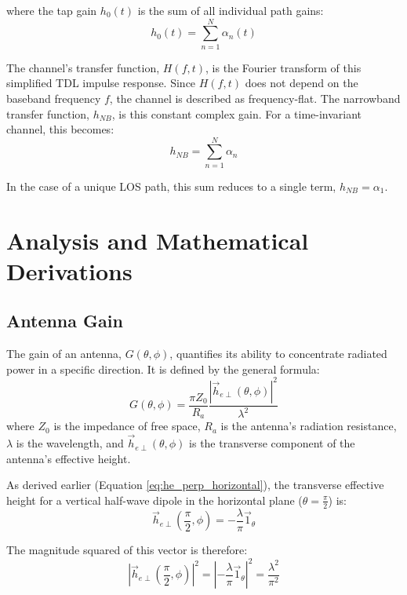 where the tap gain $h_0(t)$ is the sum of all individual path gains:
\begin{equation}
	h_0(t) = \sum_{n=1}^{N} \alpha_n(t)
\end{equation}

The channel's transfer function, $H(f,t)$, is the Fourier transform of this simplified TDL impulse response. Since $H(f,t)$ does not depend on the baseband frequency $f$, the channel is described as frequency-flat. The narrowband transfer function, $h_{NB}$, is this constant complex gain. For a time-invariant channel, this becomes:
\begin{equation}
	\label{eq:narrow}
	h_{NB} = \sum_{n=1}^{N} \alpha_n
\end{equation}

In the case of a unique LOS path, this sum reduces to a single term, $h_{NB} = \alpha_1$.

\section{Analysis and Mathematical Derivations}

\subsection{Antenna Gain}
The gain of an antenna, $G(\theta, \phi)$, quantifies its ability to concentrate radiated power in a specific direction. It is defined by the general formula:
\begin{equation}
	G(\theta,\phi) = \frac{\pi Z_0}{R_a} \frac{|\vec{h}_{e\perp}(\theta,\phi)|^2}{\lambda^2}
	\label{eq:gain_general}
\end{equation}
where $Z_0$ is the impedance of free space, $R_a$ is the antenna's radiation resistance, $\lambda$ is the wavelength, and $\vec{h}_{e\perp}(\theta,\phi)$ is the transverse component of the antenna's effective height.

As derived earlier (Equation \ref{eq:he_perp_horizontal}), the transverse effective height for a vertical half-wave dipole in the horizontal plane ($\theta = \frac{\pi}{2}$) is:
\begin{equation}
	\vec{h}_{e\perp}\left(\frac{\pi}{2},\phi\right) = -\frac{\lambda}{\pi}\vec{1}_{\theta}
\end{equation}

The magnitude squared of this vector is therefore:
\begin{equation}
	\left|\vec{h}_{e\perp}\left(\frac{\pi}{2},\phi\right)\right|^2 = \left|-\frac{\lambda}{\pi}\vec{1}_{\theta}\right|^2 = \frac{\lambda^2}{\pi^2}
\end{equation}

